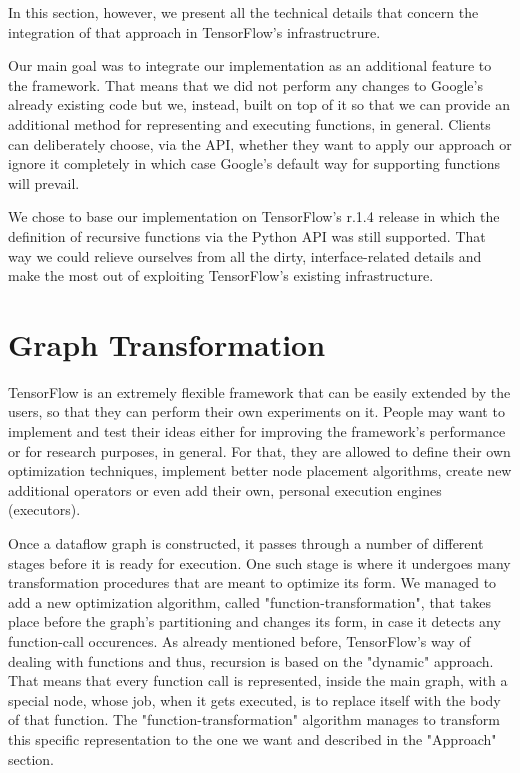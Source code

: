 \documentclass[ack,preface]{dithesis}
\begin{document}
In this section, however, we present all the technical details that concern the integration of that approach in TensorFlow's infrastructrure.

Our main goal was to integrate our implementation as an additional feature to the framework. That means that we did not perform any changes to Google's already existing code but we, instead, built on top of it so that we can provide an additional method for representing and executing functions, in general. Clients can deliberately choose, via the API, whether they want to apply our approach or ignore it completely in which case Google's default way for supporting functions will prevail.

We chose to base our implementation on TensorFlow's r.1.4 release in which the definition of recursive functions via the Python API was still supported. That way we could relieve ourselves from all the dirty, interface-related details and make the most out of exploiting TensorFlow's existing infrastructure.  



    \section{Graph Transformation}

TensorFlow is an extremely flexible framework that  can be easily extended by the users, so that they can perform their own experiments on it. People may want to implement and test their  ideas either for improving the framework's performance or for research purposes, in general. For that, they are allowed to define their own optimization techniques, implement better node placement algorithms, create new additional operators or even add their own, personal execution engines (executors).

Once a dataflow graph is constructed, it passes through a number of different stages before it is ready for execution. One such stage is where it undergoes many transformation procedures that are meant to optimize its form. We managed to add a new optimization algorithm, called "function-transformation", that takes place before the graph's partitioning and changes its form, in case it detects any function-call occurences.
As already mentioned before, TensorFlow's  way of dealing with functions and thus, recursion is based on the "dynamic" approach. That means that every function call is represented, inside the main graph, with a special node, whose job, when it gets executed, is to replace itself with the body of that function. The "function-transformation" algorithm  manages to transform this specific representation to the one we want and described in the "Approach" section. 
\end{document}
